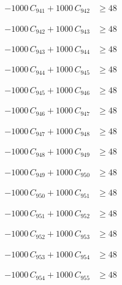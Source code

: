 \documentclass[a4paper,11pt]{article}
\begin{document}
\begin{align}
-1000\,C_{941} + 1000\,C_{942} &\geq 48 \nonumber
\end{align}

\begin{align}
-1000\,C_{942} + 1000\,C_{943} &\geq 48 \nonumber
\end{align}

\begin{align}
-1000\,C_{943} + 1000\,C_{944} &\geq 48 \nonumber
\end{align}

\begin{align}
-1000\,C_{944} + 1000\,C_{945} &\geq 48 \nonumber
\end{align}

\begin{align}
-1000\,C_{945} + 1000\,C_{946} &\geq 48 \nonumber
\end{align}

\begin{align}
-1000\,C_{946} + 1000\,C_{947} &\geq 48 \nonumber
\end{align}

\begin{align}
-1000\,C_{947} + 1000\,C_{948} &\geq 48 \nonumber
\end{align}

\begin{align}
-1000\,C_{948} + 1000\,C_{949} &\geq 48 \nonumber
\end{align}

\begin{align}
-1000\,C_{949} + 1000\,C_{950} &\geq 48 \nonumber
\end{align}

\begin{align}
-1000\,C_{950} + 1000\,C_{951} &\geq 48 \nonumber
\end{align}

\begin{align}
-1000\,C_{951} + 1000\,C_{952} &\geq 48 \nonumber
\end{align}

\begin{align}
-1000\,C_{952} + 1000\,C_{953} &\geq 48 \nonumber
\end{align}

\begin{align}
-1000\,C_{953} + 1000\,C_{954} &\geq 48 \nonumber
\end{align}

\begin{align}
-1000\,C_{954} + 1000\,C_{955} &\geq 48 \nonumber
\end{align}
\end{document}
